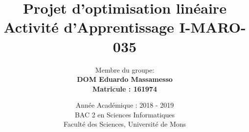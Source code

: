 \documentclass[]{article}
\begin{document}

\title{
{\Huge Projet d'optimisation linéaire}\\
\smallskip
{\small Activité d'Apprentissage \textsf{I-MARO-035}}\\
}

\author{
Membre du groupe:\\
\textbf{DOM Eduardo Massamesso}\\
\textbf{Matricule : 161974}
}


\date{Année Académique : 2018 - 2019\\
BAC 2 en Sciences Informatiques\\
\vspace{1cm}
Faculté des Sciences, Université de Mons}


%
%
%
%
%
%


\maketitle              %
\end{document}
